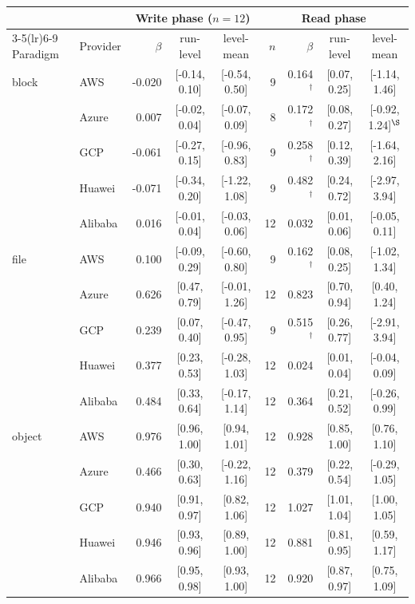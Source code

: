 \begin{tabular}{llrccrrcc}
\toprule
 & & \multicolumn{3}{c}{Write phase ($n = 12$)} & \multicolumn{4}{c}{Read phase} \\
\cmidrule(lr){3-5}\cmidrule(lr){6-9}
Paradigm & Provider & $\beta$ & run-level & level-mean & $n$ & $\beta$ & run-level & level-mean \\
\midrule
block & AWS & -0.020 & [-0.14, 0.10] & [-0.54, 0.50] & 9 & 0.164$^{\dagger}$ & [0.07, 0.25] & [-1.14, 1.46] \\
 & Azure & 0.007 & [-0.02, 0.04] & [-0.07, 0.09] & 8 & 0.172$^{\dagger}$ & [0.08, 0.27] & [-0.92, 1.24]$^{\S}$ \\
 & GCP & -0.061 & [-0.27, 0.15] & [-0.96, 0.83] & 9 & 0.258$^{\dagger}$ & [0.12, 0.39] & [-1.64, 2.16] \\
 & Huawei & -0.071 & [-0.34, 0.20] & [-1.22, 1.08] & 9 & 0.482$^{\dagger}$ & [0.24, 0.72] & [-2.97, 3.94] \\
 & Alibaba & 0.016 & [-0.01, 0.04] & [-0.03, 0.06] & 12 & 0.032 & [0.01, 0.06] & [-0.05, 0.11] \\
\midrule
file & AWS & 0.100 & [-0.09, 0.29] & [-0.60, 0.80] & 9 & 0.162$^{\dagger}$ & [0.08, 0.25] & [-1.02, 1.34] \\
 & Azure & 0.626 & [0.47, 0.79] & [-0.01, 1.26] & 12 & 0.823 & [0.70, 0.94] & [0.40, 1.24] \\
 & GCP & 0.239 & [0.07, 0.40] & [-0.47, 0.95] & 9 & 0.515$^{\dagger}$ & [0.26, 0.77] & [-2.91, 3.94] \\
 & Huawei & 0.377 & [0.23, 0.53] & [-0.28, 1.03] & 12 & 0.024 & [0.01, 0.04] & [-0.04, 0.09] \\
 & Alibaba & 0.484 & [0.33, 0.64] & [-0.17, 1.14] & 12 & 0.364 & [0.21, 0.52] & [-0.26, 0.99] \\
\midrule
object & AWS & 0.976 & [0.96, 1.00] & [0.94, 1.01] & 12 & 0.928 & [0.85, 1.00] & [0.76, 1.10] \\
 & Azure & 0.466 & [0.30, 0.63] & [-0.22, 1.16] & 12 & 0.379 & [0.22, 0.54] & [-0.29, 1.05] \\
 & GCP & 0.940 & [0.91, 0.97] & [0.82, 1.06] & 12 & 1.027 & [1.01, 1.04] & [1.00, 1.05] \\
 & Huawei & 0.946 & [0.93, 0.96] & [0.89, 1.00] & 12 & 0.881 & [0.81, 0.95] & [0.59, 1.17] \\
 & Alibaba & 0.966 & [0.95, 0.98] & [0.93, 1.00] & 12 & 0.920 & [0.87, 0.97] & [0.75, 1.09] \\
\bottomrule
\end{tabular}
